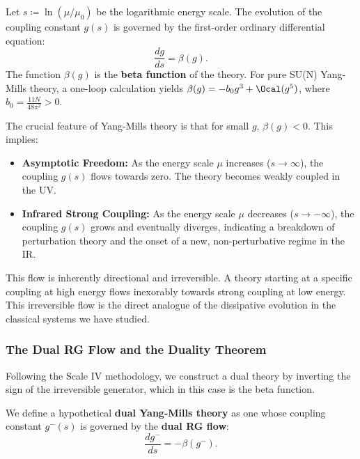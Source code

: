 \begin{definition}
Let $s \coloneqq \ln(\mu/\mu_0)$ be the logarithmic energy scale. The evolution of the coupling constant $g(s)$ is governed by the first-order ordinary differential equation:
\begin{equation} \label{eq:rg_flow}
    \frac{dg}{ds} = \beta(g).
\end{equation}
The function $\beta(g)$ is the \textbf{beta function} of the theory. For pure SU(N) Yang-Mills theory, a one-loop calculation yields $\beta(g) = -b_0 g^3 + \Ocal(g^5)$, where $b_0 = \frac{11N}{48\pi^2} > 0$.
\end{definition}

The crucial feature of Yang-Mills theory is that for small $g$, $\beta(g) < 0$. This implies:
\begin{itemize}
    \item \textbf{Asymptotic Freedom:} As the energy scale $\mu$ increases ($s \to \infty$), the coupling $g(s)$ flows towards zero. The theory becomes weakly coupled in the UV.
    \item \textbf{Infrared Strong Coupling:} As the energy scale $\mu$ decreases ($s \to -\infty$), the coupling $g(s)$ grows and eventually diverges, indicating a breakdown of perturbation theory and the onset of a new, non-perturbative regime in the IR.
\end{itemize}
This flow is inherently directional and irreversible. A theory starting at a specific coupling at high energy flows inexorably towards strong coupling at low energy. This irreversible flow is the direct analogue of the dissipative evolution in the classical systems we have studied.

\subsubsection{The Dual RG Flow and the Duality Theorem}
Following the Scale IV methodology, we construct a dual theory by inverting the sign of the irreversible generator, which in this case is the beta function.

\begin{definition}
We define a hypothetical \textbf{dual Yang-Mills theory} as one whose coupling constant $g^-(s)$ is governed by the \textbf{dual RG flow}:
\begin{equation} \label{eq:dual_rg_flow}
    \frac{dg^-}{ds} = -\beta(g^-).
\end{equation}
\end{definition}

